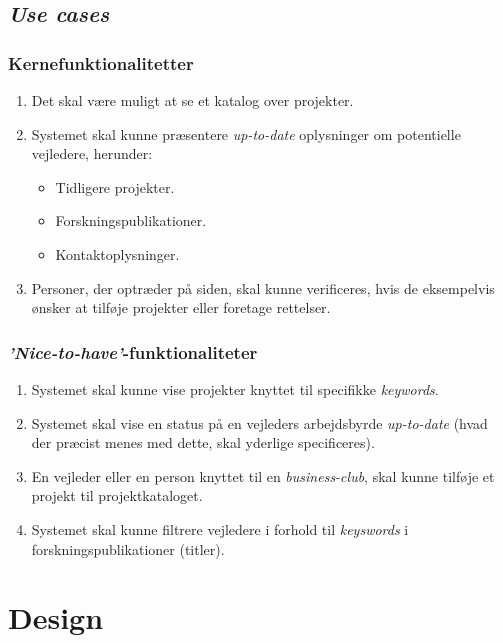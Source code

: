 \documentclass[12pt]{article}
\begin{document}
\subsection*{\textit{Use cases}}

\subsubsection*{Kernefunktionalitetter}
\begin{enumerate}
	\item Det skal være muligt at se et katalog over projekter.
	\item Systemet skal kunne præsentere \textit{up-to-date} oplysninger om potentielle vejledere, herunder:
	\begin{itemize}
		\item Tidligere projekter.
		\item Forskningspublikationer.
		\item Kontaktoplysninger.
	\end{itemize}
	\item Personer, der optræder på siden, skal kunne verificeres, hvis de eksempelvis ønsker at tilføje projekter eller foretage rettelser.
\end{enumerate}

\subsubsection*{\textit{'Nice-to-have'}-funktionaliteter}
\begin{enumerate}
  \item Systemet skal kunne vise projekter knyttet til specifikke \textit{keywords}.

  \item Systemet skal vise en status på en vejleders arbejdsbyrde \textit{up-to-date} (hvad der præcist menes med dette, skal yderlige specificeres).
  \item En vejleder eller en person knyttet til en \textit{business-club}, skal kunne tilføje et projekt til projektkataloget.

	\item Systemet skal kunne filtrere vejledere i forhold til \textit{keyswords} i forskningspublikationer (titler).
\end{enumerate}


\section{Design}
\label{sec:design}
\end{document}
